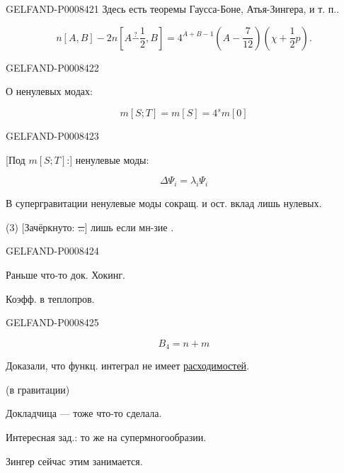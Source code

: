 \begin{GelfandAdjacentEvidence}{GELFAND-P000842}{1}
Здесь есть теоремы Гаусса-Боне, Атья-Зингера, и т. п..

\begin{equation*}
n[A,B]-2n\left[A\overset{?}{-}\frac12,B\right]
=4^{A+B-1}\left(A-\frac7{12}\right)\left(\chi+\frac12p\right).
\tag{3}
\end{equation*}
\end{GelfandAdjacentEvidence}
\begin{GelfandAdjacentEvidence}{GELFAND-P000842}{2}


О ненулевых модах:

\begin{equation*}
m[S;T]=m[S]=4^s m[0]
\tag{4}
\end{equation*}
\end{GelfandAdjacentEvidence}
\begin{GelfandAdjacentEvidence}{GELFAND-P000842}{3}


[Под \(m[S;T]\):] ненулевые моды:

\begin{equation*}
\Delta\Psi_i=\lambda_i\Psi_i
\tag{5}
\end{equation*}

В супергравитации ненулевые моды сокращ. и ост. вклад лишь нулевых.

(3) [Зачёркнуто: \sout{…}] лишь если мн-зие .
\end{GelfandAdjacentEvidence}
\begin{GelfandAdjacentEvidence}{GELFAND-P000842}{4}


Раньше что-то док. Хокинг.

Коэфф. в теплопров.
\end{GelfandAdjacentEvidence}
\begin{GelfandAdjacentEvidence}{GELFAND-P000842}{5}


\[
B_4=n+m
\]

Доказали, что функц. интеграл не имеет \uline{расходимостей}.

(в гравитации)

Докладчица — тоже что-то сделала.

Интересная зад.: то же на супермногообразии.

Зингер сейчас этим занимается.

\end{GelfandAdjacentEvidence}
